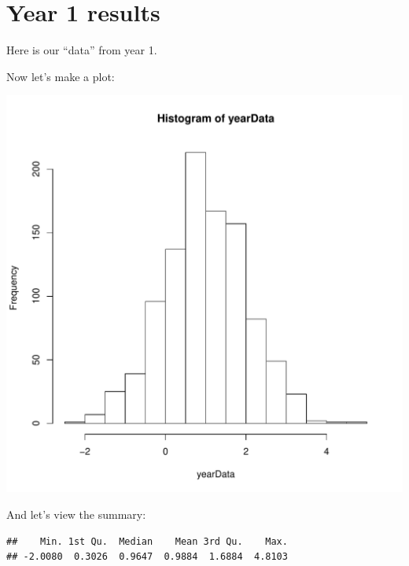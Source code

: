 \section{Year 1 results}
Here is our ``data'' from year 1.
\begin{knitrout}
\color{fgcolor}\begin{kframe}
\begin{alltt}
 \hlkwb{=} \hlstd{(}\hlstd{,}  
\hlopt{::}\hlopt{$}\hlstd{(} \hlstd{=} \hlstd{(}\hlstd{))}
\end{alltt}
\end{kframe}
\end{knitrout}
Now let's make a plot:
\begin{knitrout}
\color{fgcolor}\begin{kframe}
\begin{alltt}
\end{alltt}
\end{kframe}
\includegraphics[width=\maxwidth]{year1/histogram-1} 

\end{knitrout}
And let's view the summary:
\begin{knitrout}
\color{fgcolor}\begin{kframe}
\begin{alltt}
\end{alltt}
\begin{verbatim}
##    Min. 1st Qu.  Median    Mean 3rd Qu.    Max. 
## -2.0080  0.3026  0.9647  0.9884  1.6884  4.8103
\end{verbatim}
\end{kframe}
\end{knitrout}

